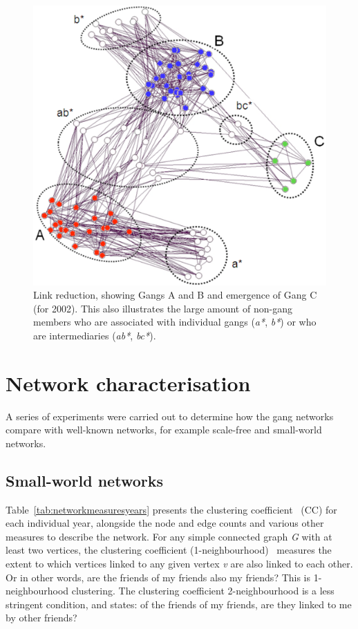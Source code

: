 \documentclass[twocolumn]{svjour3}          %
\theoremstyle{definition}
\begin{document}
\begin{figure}[htb]
\centering
\includegraphics[width=\columnwidth]{images/2002core_labelled}
\caption{Link reduction, showing Gangs A and B and emergence of
  Gang C (for 2002). This also illustrates the large amount of non-gang
  members who are associated with individual gangs (\emph{a*}, \emph{b*}) or who are intermediaries (\emph{ab*}, \emph{bc*}).}
\label{fig:2002core_labelled}
\end{figure}


\section{Network characterisation}\label{sec:networkcharacteristics}

A series of experiments were carried out to determine how the gang
networks compare with well-known networks, for example scale-free and
small-world networks.

\subsection{Small-world networks}\label{sec:smallworld}

Table~\ref{tab:networkmeasuresyears} presents the clustering
coefficient~\citep{WattsStrogatz1998} (CC) for each individual year,
alongside the node and edge counts and various other measures to
describe the network. For any simple connected graph \emph{G} with at
least two vertices, the clustering coefficient
(1-neighbourhood)~\citep{WattsStrogatz1998} measures the extent to
which vertices linked to any given vertex \emph{v} are also linked to
each other. Or in other words, are the friends of my friends also my
friends? This is 1-neighbourhood clustering. The clustering
coefficient 2-neighbourhood is a less stringent condition, and states:
of the friends of my friends, are they linked to me by other friends?
\end{document}
